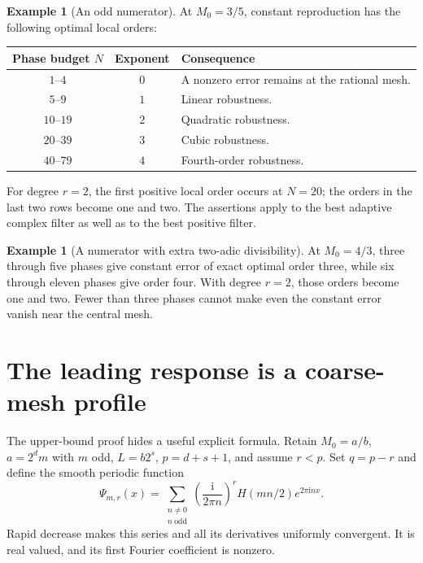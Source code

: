 \documentclass[11pt,a4paper]{article}
\numberwithin{equation}{section}
\theoremstyle{plain}
\theoremstyle{definition}
\newtheorem{example}[theorem]{Example}
\theoremstyle{remark}
\newcommand{\ii}{\mathrm i}\newcommand{\dd}{\,\mathrm d}
\begin{document}
\begin{example}[An odd numerator]\label{ex:three-fifths}
At $M_0=3/5$, constant reproduction has the following optimal local orders:
\begin{center}
\begin{tabular}{ccl}
\toprule
Phase budget $N$ & Exponent & Consequence\\
\midrule
$1$--$4$ & $0$ & A nonzero error remains at the rational mesh.\\
$5$--$9$ & $1$ & Linear robustness.\\
$10$--$19$ & $2$ & Quadratic robustness.\\
$20$--$39$ & $3$ & Cubic robustness.\\
$40$--$79$ & $4$ & Fourth-order robustness.\\
\bottomrule
\end{tabular}
\end{center}
For degree $r=2$, the first positive local order occurs at $N=20$; the
orders in the last two rows become one and two. The assertions apply to the
best adaptive complex filter as well as to the best positive filter.
\end{example}

\begin{example}[A numerator with extra two-adic divisibility]
At $M_0=4/3$, three through five phases give constant error of exact optimal
order three, while six through eleven phases give order four. With degree
$r=2$, those orders become one and two. Fewer than three phases cannot make
even the constant error vanish near the central mesh.
\end{example}

\section{The leading response is a coarse-mesh profile}
\label{sec:profile}

The upper-bound proof hides a useful explicit formula. Retain $M_0=a/b$,
$a=2^d m$ with $m$ odd, $L=b2^s$, $p=d+s+1$, and assume $r<p$.
Set $q=p-r$ and define the smooth periodic function
\begin{equation}\label{eq:Psi}
 \Psi_{m,r}(x)=
 \sum_{\substack{n\ne0\\n\ \mathrm{odd}}}
 \left(\frac{\ii}{2\pi n}\right)^r H(mn/2)e^{2\pi\ii nx}.
\end{equation}
Rapid decrease makes this series and all its derivatives uniformly
convergent. It is real valued, and its first Fourier coefficient is nonzero.
\end{document}
